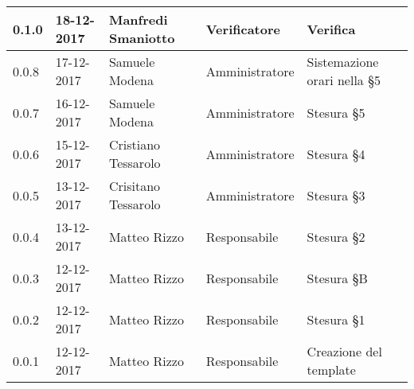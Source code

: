 \documentclass[./PianodiProgetto.tex]{subfiles}
\begin{document}
\begin{longtable}{|p{20mm}|p{20mm}|p{40mm}|p{30mm}|p{50mm}|}
		\hline 0.1.0 & 18-12-2017 & Manfredi Smaniotto & Verificatore & Verifica \\
 		
 		\hline 0.0.8 & 17-12-2017 & Samuele Modena & Amministratore & Sistemazione orari nella §5 \\
 		
		\hline 0.0.7 & 16-12-2017 & Samuele Modena & Amministratore & Stesura §5 \\
 
		\hline 0.0.6 & 15-12-2017 & Cristiano Tessarolo & Amministratore & Stesura §4 \\
 
		\hline 0.0.5 & 13-12-2017 & Crisitano Tessarolo & Amministratore & Stesura §3 \\
 
		\hline 0.0.4 & 13-12-2017 & Matteo Rizzo & Responsabile & Stesura §2 \\
 
 		\hline 0.0.3 & 12-12-2017 & Matteo Rizzo & Responsabile & Stesura §B \\
 		
		\hline 0.0.2 & 12-12-2017 & Matteo Rizzo & Responsabile & Stesura §1 \\
 
 		\hline 0.0.1 & 12-12-2017 & Matteo Rizzo & Responsabile & Creazione del template \\
 
		\hline
 
	\end{longtable}
\end{document}
